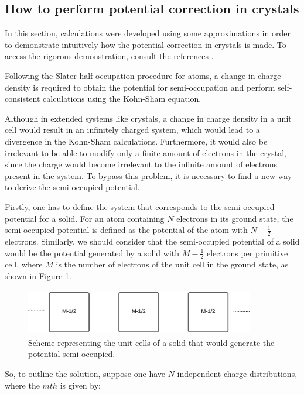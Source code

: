 \subsection{How to perform potential correction in crystals}

In this section, calculations were developed using some approximations in order to demonstrate
intuitively how the potential correction in crystals is made. To access the rigorous demonstration, consult the references \cite{PhysRevB.78.125116} \cite{doi:10.1063/1.3624562}. 

Following the Slater half occupation procedure for atoms, a change in charge density is required
to obtain the potential for semi-occupation and perform self-consistent calculations using the Kohn-Sham equation.

Although in extended systems like crystals, a change in charge density in a unit cell would result in an infinitely charged system, which would lead to a 
divergence in the Kohn-Sham calculations. Furthermore, it would also be irrelevant to be able to modify only a finite amount of electrons in the crystal, since
the charge would become irrelevant to the infinite amount of electrons present in the system. To bypass this problem, it is necessary to find a new way
to derive the semi-occupied potential.

Firstly, one has to define the system that corresponds to the semi-occupied potential for a solid. For an atom containing
$N$ electrons in its ground state, the semi-occupied potential is defined as the potential of the atom with $N-\frac{1}{2}$ electrons. Similarly, we should consider that the semi-occupied potential of a solid would be the potential generated by a solid with $M-\frac{1}{2}$ electrons per primitive cell, where $M$ is the number of electrons
of the unit cell in the ground state, as shown in Figure \ref{semi-solid}.

\begin{figure}[!ht]
        \centering
        \includegraphics[width=10cm,height=2cm]{images/semi-solid.eps}
        \caption{Scheme representing the unit cells of a solid that would generate the potential semi-occupied.}
        \label{semi-solid}
\end{figure}
So, to outline the solution, suppose one have $N$ independent charge distributions, where the $mth$ is given by:

